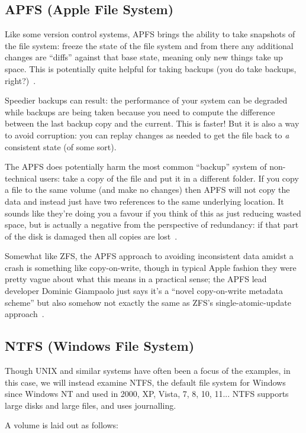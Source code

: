 \subsection*{APFS (Apple File System)}

Like some version control systems, APFS brings the ability to take snapshots of the file system: freeze the state of the file system and from there any additional changes are ``diffs'' against that base state, meaning only new things take up space. This is potentially quite helpful for taking backups (you do take backups, right?)~\cite{apfs}.

Speedier backups can result: the performance of your system can be degraded while backups are being taken because you need to compute the difference between the last backup copy and the current. This is faster! But it is also a way to avoid corruption: you can replay changes as needed to get the file back to \textit{a} consistent state (of some sort).

The APFS does potentially harm the most common ``backup'' system of non-technical users: take a copy of the file and put it in a different folder. If you copy a file to the same volume (and make no changes) then APFS will not copy the data and instead just have two references to the same underlying location. It sounds like they're doing you a favour if you think of this as just reducing wasted space, but is actually a negative from the perspective of redundancy: if that part of the disk is damaged then all copies are lost~\cite{apfs}.

Somewhat like ZFS, the APFS approach to avoiding inconsistent data amidst a crash is something like copy-on-write, though in typical Apple fashion they were pretty vague about what this means in a practical sense; the APFS lead developer Dominic Giampaolo just says it's a ``novel copy-on-write metadata scheme'' but also somehow not exactly the same as ZFS's single-atomic-update approach~\cite{apfs}.

\subsection*{NTFS (Windows File System)}
Though UNIX and similar systems have often been a focus of the examples, in this case, we will instead examine NTFS, the default file system for Windows since Windows NT and used in 2000, XP, Vista, 7, 8, 10, 11... NTFS supports large disks and large files, and uses journalling.

A volume is laid out as follows:

